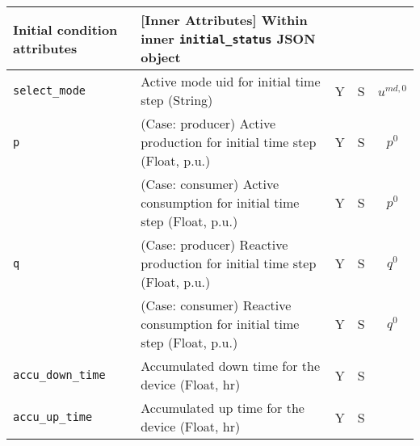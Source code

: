 \documentclass{article}
\begin{document}
\begin{center}
\small
\begin{tabular}{ l | l | c | c | c |}
  \hline
  Initial condition attributes & [Inner Attributes] Within inner {\tt initial\_status} JSON object &  &  & \\
  \hline
  {\tt select\_mode}  & Active mode uid for initial time step (String) & Y & S & $u^{md,0}$\\
  {\tt p} & { (Case: producer) Active production for initial time step (Float, p.u.) }& Y & S & $p^0$ \\
          & { (Case: consumer) Active consumption for initial time step (Float, p.u.) }& Y & S & $p^0$ \\
  {\tt q} & { (Case: producer) Reactive production for initial time step (Float, p.u.) }& Y & S & $q^0$ \\
          & { (Case: consumer) Reactive consumption for initial time step (Float, p.u.) }& Y & S & $q^0$ \\
  {\tt accu\_down\_time} & Accumulated down time for the device (Float, hr) & Y & S & \\
  {\tt accu\_up\_time} & Accumulated up time for the device (Float, hr) & Y & S & \\        
  \hline
  \end{tabular}
\end{center}
\end{document}

